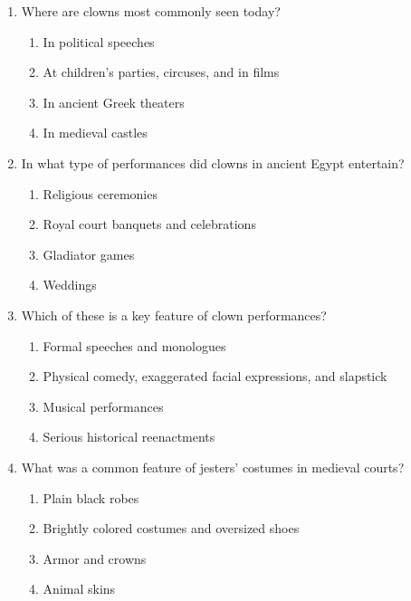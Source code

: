 \documentclass[12pt]{article}
\begin{document}
\begin{enumerate}
    \vspace{0.5cm}

    \item Where are clowns most commonly seen today?

    \begin{enumerate}[label=\Alph*.]
        \item In political speeches
        \item At children's parties, circuses, and in films
        \item In ancient Greek theaters
        \item In medieval castles
    \end{enumerate}
    
    \vspace{0.5cm}

    \item In what type of performances did clowns in ancient Egypt entertain?

    \begin{enumerate}[label=\Alph*.]
        \item Religious ceremonies
        \item Royal court banquets and celebrations
        \item Gladiator games
        \item Weddings
    \end{enumerate}
    
    \vspace{0.5cm}

    \item Which of these is a key feature of clown performances?

    \begin{enumerate}[label=\Alph*.]
        \item Formal speeches and monologues
        \item Physical comedy, exaggerated facial expressions, and slapstick
        \item Musical performances
        \item Serious historical reenactments
    \end{enumerate}
    
    \vspace{0.5cm}

    \item What was a common feature of jesters' costumes in medieval courts?

    \begin{enumerate}[label=\Alph*.]
        \item Plain black robes
        \item Brightly colored costumes and oversized shoes
        \item Armor and crowns
        \item Animal skins
    \end{enumerate}
    

\end{enumerate}
\end{document}
